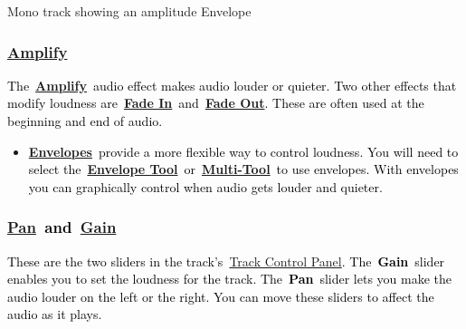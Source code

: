\documentclass[letterpaper]{article}
\begin{document}
Mono track showing an amplitude Envelope

\subsubsection[Amplify]{\href{https://manual.audacityteam.org/man/amplify.html}{\textcolor[rgb]{0.3529412,0.21176471,0.5882353}{Amplify}}}
\textcolor{black}{The~}\href{https://manual.audacityteam.org/man/amplify.html}{\textbf{\textcolor[rgb]{0.3529412,0.21176471,0.5882353}{Amplify}}}\textcolor{black}{~audio
effect makes audio louder or quieter. Two other effects that modify loudness
are~}\href{https://manual.audacityteam.org/man/fades.html#linearfade}{\textbf{\textcolor[rgb]{0.3529412,0.21176471,0.5882353}{Fade
In}}}\textcolor{black}{~and~}\href{https://manual.audacityteam.org/man/fades.html#linearfade}{\textbf{\textcolor[rgb]{0.3529412,0.21176471,0.5882353}{Fade
Out}}}\textcolor{black}{. These are often used at the beginning and end of audio.}

\begin{itemize}
\item
\href{https://manual.audacityteam.org/man/envelope_tool.html}{\textbf{\textcolor[rgb]{0.3529412,0.21176471,0.5882353}{Envelopes}}}\textcolor{black}{~provide
a more flexible way to control loudness. You will need to select
the~}\href{https://manual.audacityteam.org/man/envelope_tool.html}{\textbf{\textcolor[rgb]{0.3529412,0.21176471,0.5882353}{Envelope
Tool}}}\textcolor{black}{~or~}\href{https://manual.audacityteam.org/man/multi_tool.html}{\textbf{\textcolor[rgb]{0.3529412,0.21176471,0.5882353}{Multi-Tool}}}\textcolor{black}{~to
use envelopes. With envelopes you can graphically control when audio gets louder and quieter.}
\end{itemize}
\subsubsection[Pan~and~Gain]{\href{https://manual.audacityteam.org/man/audio_tracks.html\#pan}{\textcolor[rgb]{0.3529412,0.21176471,0.5882353}{Pan}}\textcolor{black}{~and~}\href{https://manual.audacityteam.org/man/audio_tracks.html\#gain}{\textcolor[rgb]{0.3529412,0.21176471,0.5882353}{Gain}}}
\textcolor{black}{These are the two sliders in the
track's~}\href{https://manual.audacityteam.org/man/audio_tracks.html#panel}{\textcolor[rgb]{0.3529412,0.21176471,0.5882353}{Track
Control Panel}}\textcolor{black}{. The~}\textbf{\textcolor{black}{Gain}}\textcolor{black}{~slider enables you to set
the loudness for the track. The~}\textbf{\textcolor{black}{Pan}}\textcolor{black}{~slider lets you make the audio
louder on the left or the right. You can move these sliders to affect the audio as it plays.}
\end{document}
